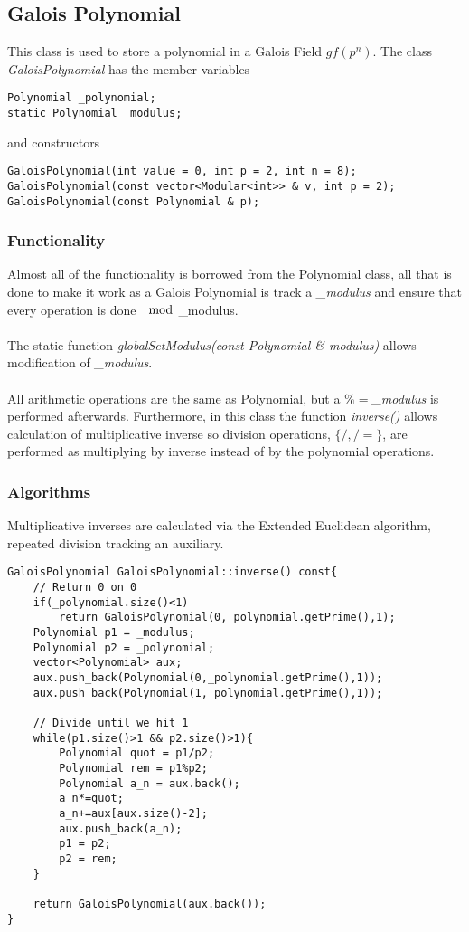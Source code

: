\documentclass{article}
\begin{document}
\subsection{Galois Polynomial}

This class is used to store a polynomial in a Galois Field $gf(p^n)$. The class {\it GaloisPolynomial} has the member variables
\begin{lstlisting}
Polynomial _polynomial;
static Polynomial _modulus;
\end{lstlisting}
and constructors
\begin{lstlisting}
GaloisPolynomial(int value = 0, int p = 2, int n = 8);
GaloisPolynomial(const vector<Modular<int>> & v, int p = 2);
GaloisPolynomial(const Polynomial & p);
\end{lstlisting}

\subsubsection{Functionality}

Almost all of the functionality is borrowed from the Polynomial class, all that is done to make it work as a Galois Polynomial is track a {\it \_modulus} and ensure that every operation is done $\mod$\_modulus.\\\\
The static function {\it globalSetModulus(const Polynomial \& modulus)} allows modification of {\it \_modulus}.\\\\
All arithmetic operations are the same as Polynomial, but a $\%=${\it \_modulus} is performed afterwards. Furthermore, in this class the function {\it inverse()} allows calculation of multiplicative inverse so division operations, $\{/,/=\}$, are performed as multiplying by inverse instead of by the polynomial operations.

\subsubsection{Algorithms}
Multiplicative inverses are calculated via the Extended Euclidean algorithm, repeated division tracking an auxiliary.
\begin{lstlisting}
GaloisPolynomial GaloisPolynomial::inverse() const{
    // Return 0 on 0
    if(_polynomial.size()<1)
        return GaloisPolynomial(0,_polynomial.getPrime(),1);
    Polynomial p1 = _modulus;
    Polynomial p2 = _polynomial;
    vector<Polynomial> aux;
    aux.push_back(Polynomial(0,_polynomial.getPrime(),1));
    aux.push_back(Polynomial(1,_polynomial.getPrime(),1));
    
    // Divide until we hit 1
    while(p1.size()>1 && p2.size()>1){
        Polynomial quot = p1/p2;
        Polynomial rem = p1%p2;
        Polynomial a_n = aux.back();
        a_n*=quot;
        a_n+=aux[aux.size()-2];
        aux.push_back(a_n);
        p1 = p2;
        p2 = rem;
    }
    
    return GaloisPolynomial(aux.back());
}
\end{lstlisting}
\end{document}
